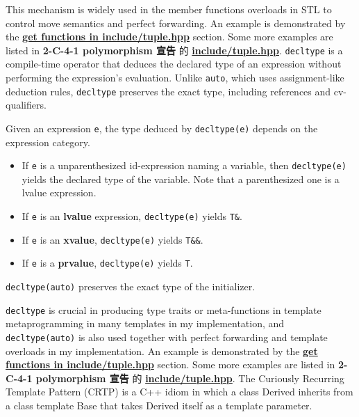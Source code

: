 \documentclass[a4paper,12pt]{article}
\begin{document}
This mechanism is widely used in the member functions overloads in STL to control move semantics and perfect forwarding. An example is demonstrated by the \hyperref[get]{\textbf{get functions in include/tuple.hpp}} section. Some more examples are listed in \textbf{2-C-4-1 polymorphism 宣告} 的 \hyperref[tuple-list]{\textbf{include/tuple.hpp}}.
\label{decltype}
\texttt{decltype} is a compile-time operator that deduces the declared type of an expression without performing the expression's evaluation. Unlike \verb|auto|, which uses assignment-like deduction rules, \texttt{decltype} preserves the exact type, including references and cv-qualifiers.

Given an expression \verb|e|, the type deduced by \texttt{decltype(e)} depends on the
expression category.
\begin{itemize}
    \item If \verb|e| is a unparenthesized id-expression naming a variable, then \texttt{decltype(e)} yields the declared type of the variable. Note that a parenthesized one is a lvalue expression.
    \item If \verb|e| is an \textbf{lvalue} expression, \texttt{decltype(e)} yields \verb|T&|.
    \item If \verb|e| is an \textbf{xvalue}, \texttt{decltype(e)} yields \verb|T&&|.
    \item If \verb|e| is a \textbf{prvalue}, \texttt{decltype(e)} yields \verb|T|.
\end{itemize}

\verb|decltype(auto)| preserves the exact type of the initializer.

\texttt{decltype} is crucial in producing type traits or meta-functions in template metaprogramming in many templates in my implementation, and \verb|decltype(auto)| is also used together with perfect forwarding and template overloads in my implementation. An example is demonstrated by the \hyperref[get]{\textbf{get functions in include/tuple.hpp}} section. Some more examples are listed in \textbf{2-C-4-1 polymorphism 宣告} 的 \hyperref[tuple-list]{\textbf{include/tuple.hpp}}.
The Curiously Recurring Template Pattern (CRTP) is a C++ idiom in which a class Derived inherits from a class template Base that takes Derived itself as a template parameter.
\end{document}
